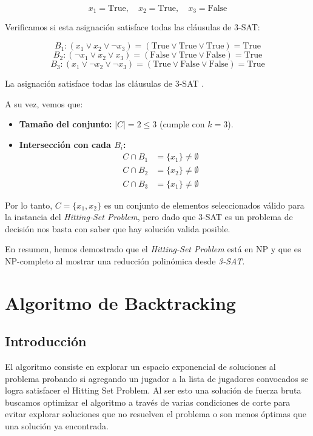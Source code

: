 \documentclass{estilo}
\begin{document}
\[ x_1 = \text{True}, \quad x_2 = \text{True}, \quad x_3 = \text{False} \]

Verificamos si esta asignación satisface todas las cláusulas de 3-SAT:

\[ B_1: (x_1 \lor x_2 \lor \neg x_3) = (\text{True} \lor \text{True} \lor \text{True}) = \text{True} \]
\[ B_2: (\neg x_1 \lor x_2 \lor x_3) = (\text{False} \lor \text{True} \lor \text{False}) = \text{True} \]
\[ B_3: (x_1 \lor \neg x_2 \lor \neg x_3) = (\text{True} \lor \text{False} \lor \text{False}) = \text{True} \]

La asignación satisface todas las cláusulas de 3-SAT \checkmark.

\newpage

A su vez, vemos que:
\begin{itemize}
    \item \textbf{Tamaño del conjunto:} \(|C| = 2 \leq 3\) (cumple con \(k = 3\)).
    \item \textbf{Intersección con cada \(B_i\):}
        \begin{align*}
            C \cap B_1 & = \{x_1\} \neq \emptyset \\
            C \cap B_2 & = \{x_2\} \neq \emptyset \\
            C \cap B_3 & = \{x_1\} \neq \emptyset \quad
        \end{align*}
\end{itemize}


Por lo tanto, \(C = \{x_1, x_2\}\) es un conjunto de elementos seleccionados válido para la instancia del \textit{Hitting-Set Problem}, pero dado que 3-SAT es un problema de decisión nos basta con saber que hay solución valida posible.

En resumen, hemos demostrado que el \textit{Hitting-Set Problem} está en NP y que es NP-completo al mostrar una reducción polinómica desde \textit{3-SAT}.

\section{Algoritmo de Backtracking}

\subsection{Introducción}
El algoritmo consiste en explorar un espacio exponencial de soluciones al problema probando si agregando un jugador a la lista de jugadores convocados se logra satisfacer el Hitting Set Problem. Al ser esto una solución de fuerza bruta buscamos optimizar el algoritmo a través de varias condiciones de corte para evitar explorar soluciones que no resuelven el problema o son menos óptimas que una solución ya encontrada. 
\end{document}
